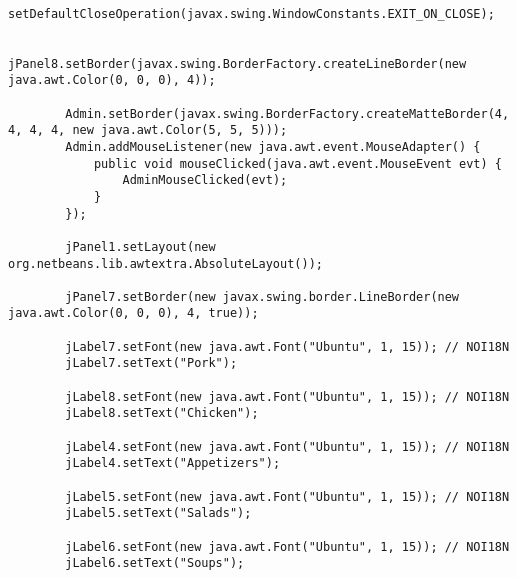 \documentclass[12pt,a4paper]{article}
\begin{document}
\begin{lstlisting}
        setDefaultCloseOperation(javax.swing.WindowConstants.EXIT_ON_CLOSE);

        jPanel8.setBorder(javax.swing.BorderFactory.createLineBorder(new java.awt.Color(0, 0, 0), 4));

        Admin.setBorder(javax.swing.BorderFactory.createMatteBorder(4, 4, 4, 4, new java.awt.Color(5, 5, 5)));
        Admin.addMouseListener(new java.awt.event.MouseAdapter() {
            public void mouseClicked(java.awt.event.MouseEvent evt) {
                AdminMouseClicked(evt);
            }
        });

        jPanel1.setLayout(new org.netbeans.lib.awtextra.AbsoluteLayout());

        jPanel7.setBorder(new javax.swing.border.LineBorder(new java.awt.Color(0, 0, 0), 4, true));

        jLabel7.setFont(new java.awt.Font("Ubuntu", 1, 15)); // NOI18N
        jLabel7.setText("Pork");

        jLabel8.setFont(new java.awt.Font("Ubuntu", 1, 15)); // NOI18N
        jLabel8.setText("Chicken");

        jLabel4.setFont(new java.awt.Font("Ubuntu", 1, 15)); // NOI18N
        jLabel4.setText("Appetizers");

        jLabel5.setFont(new java.awt.Font("Ubuntu", 1, 15)); // NOI18N
        jLabel5.setText("Salads");

        jLabel6.setFont(new java.awt.Font("Ubuntu", 1, 15)); // NOI18N
        jLabel6.setText("Soups");


\end{lstlisting}
\end{document}
